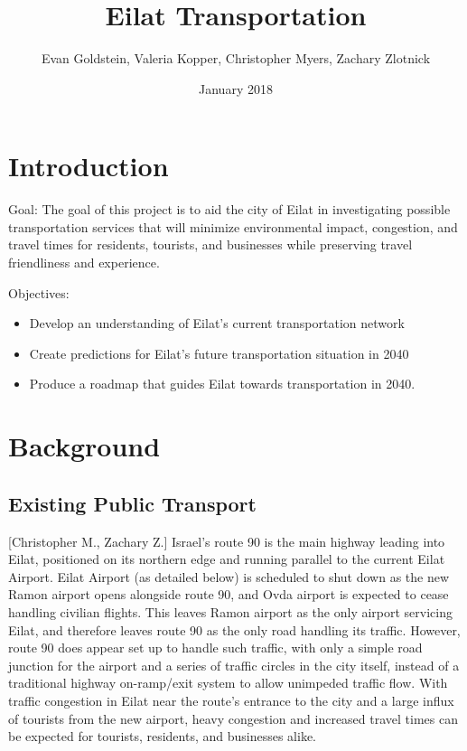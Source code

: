 \documentclass[12pt]{article}                         %
\title{Eilat Transportation}
\author{Evan Goldstein, Valeria Kopper, Christopher Myers, Zachary Zlotnick}
\date{January 2018}
\begin{document}
\maketitle
\newpage

\renewcommand\abstractname{Summary} %

\tableofcontents
\newpage
\listofauthorships
\newpage
{}
\doublespacing

\section{Introduction}

Goal: The goal of this project is to aid the city of Eilat in investigating possible transportation services that will minimize environmental impact, congestion, and travel times for residents, tourists, and businesses while preserving travel friendliness and experience.

Objectives:
\begin{itemize}
    \item Develop an understanding of Eilat's current transportation network
    
    \item Create predictions for Eilat's future transportation situation in 2040
    
    \item Produce a roadmap that guides Eilat towards transportation in 2040.
\end{itemize}

\newpage
\section{Background}

\subsection{Existing Public Transport}[Christopher M., Zachary Z.]
Israel's route 90 is the main highway leading into Eilat, positioned on its northern edge and running parallel to the current Eilat Airport. Eilat Airport (as detailed below) is scheduled to shut down as the new Ramon airport opens alongside route 90, and Ovda airport is expected to cease handling civilian flights. This leaves Ramon airport as the only airport servicing Eilat, and therefore leaves route 90 as the only road handling its traffic. However, route 90 does appear set up to handle such traffic, with only a simple road junction for the airport and a series of traffic circles in the city itself, instead of a traditional highway on-ramp/exit system to allow unimpeded traffic flow. With traffic congestion in Eilat near the route's entrance to the city and a large influx of tourists from the new airport, heavy congestion and increased travel times can be expected for tourists, residents, and businesses alike.
\end{document}

